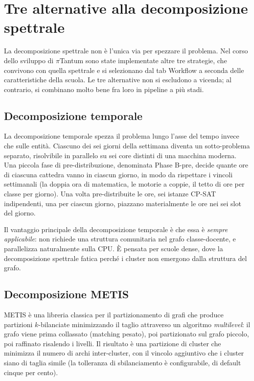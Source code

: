 \section{Tre alternative alla decomposizione spettrale}

La decomposizione spettrale non \`e l'unica via per spezzare
il problema. Nel corso dello sviluppo di $\pi$Tantum sono
state implementate altre tre strategie, che convivono con
quella spettrale e si selezionano dal tab Workflow a
seconda delle caratteristiche della scuola. Le tre
alternative non si escludono a vicenda; al contrario, si
combinano molto bene fra loro in pipeline a pi\`u stadi.

\subsection{Decomposizione temporale}

La decomposizione temporale spezza il problema lungo l'asse
del tempo invece che sulle entit\`a. Ciascuno dei sei
giorni della settimana diventa un sotto-problema separato,
risolvibile in parallelo su sei core distinti di una
macchina moderna. Una piccola fase di pre-distribuzione,
denominata Phase B-pre, decide quante ore di ciascuna
cattedra vanno in ciascun giorno, in modo da rispettare i
vincoli settimanali (la doppia ora di matematica, le
motorie a coppie, il tetto di ore per classe per giorno).
Una volta pre-distribuite le ore, sei istanze CP-SAT
indipendenti, una per ciascun giorno, piazzano materialmente
le ore nei sei slot del giorno.

Il vantaggio principale della decomposizione temporale \`e
che essa \`e \emph{sempre applicabile}: non richiede una
struttura comunitaria nel grafo classe-docente, e
parallelizza naturalmente sulla CPU. \`E pensata per scuole
dense, dove la decomposizione spettrale fatica perch\'e i
cluster non emergono dalla struttura del grafo.

\subsection{Decomposizione METIS}

METIS \`e una libreria classica per il partizionamento di
grafi che produce partizioni $k$-bilanciate minimizzando il
taglio attraverso un algoritmo \emph{multilevel}: il grafo
viene prima collassato (matching pesato), poi partizionato
sul grafo piccolo, poi raffinato risalendo i livelli. Il
risultato \`e una partizione di cluster che minimizza il
numero di archi inter-cluster, con il vincolo aggiuntivo
che i cluster siano di taglia simile (la tolleranza di
sbilanciamento \`e configurabile, di default cinque per
cento).

